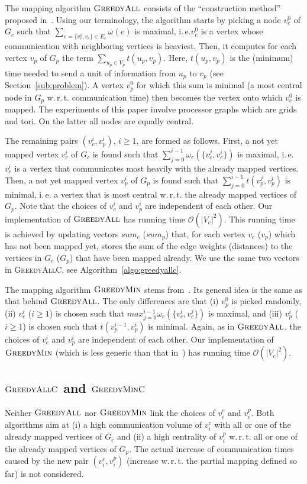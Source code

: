 \documentclass[pdftex]{llncs}
\newcommand{\ie}{i.\,e.\xspace}
\newcommand{\bigO}{\mathcal{O}}
\newcommand{\wrt}{w.\,r.\,t.\xspace}
\newcommand{\greedyall}{\textsc{GreedyAll}\xspace}
\newcommand{\greedyallc}{\textsc{GreedyAllC}\xspace}
\newcommand{\greedymin}{\textsc{GreedyMin}\xspace}
\newcommand{\greedyminc}{\textsc{GreedyMinC}\xspace}
\begin{document}
The mapping algorithm $\greedyall$ consists of the ``construction
method'' proposed in~\cite{Brandfass2013372}. Using our terminology,
the algorithm starts by picking a node $v^0_c$ of $G_c$ such that
$\sum_{e = \{v^0_c, v_c\} \in E_c} \omega(e)$ is maximal, \ie $v^0_c$
is a vertex whose communication with neighboring vertices is
heaviest. Then, it computes for each vertex $v_p$ of $G_p$ the term
$\sum_{u_p \in V_p} t(u_p, v_p)$. Here, $t(u_p, v_p)$ is the (minimum)
time needed to send a unit of information from $u_p$ to $v_p$ (see
Section~\ref{sub:problem}). A vertex $v^0_p$ for which this sum is
minimal (a most central node in $G_p$ \wrt communication time) then
becomes the vertex onto which $v^0_c$ is mapped. The experiments of
this paper involve processor graphs which are grids and tori. On the
latter all nodes are equally central.

The remaining pairs $(v^i_c, v^i_p)$, $i \geq 1$, are formed as
follows. First, a not yet mapped vertex $v^i_c$ of $G_c$ is found such
that $\sum^{i-1}_{j=0}\omega_c(\{v^j_c, v^{i}_c\})$ is maximal, \ie
$v^i_c$ is a vertex that communicates most heavily with the already
mapped vertices. Then, a not yet mapped vertex $v^i_p$ of $G_p$ is
found such that $\sum^{i-1}_{j=0}t(v^j_p, v^i_p)$ is minimal, \ie a
vertex that is most central \wrt the already mapped vertices of
$G_p$. Note that the choices of $v^i_c$ and $v^i_p$ are independent of
each other. Our implementation of $\greedyall$ has running time
$\bigO(\vert V_c \vert^2)$. This running time is achieved by updating
vectors $sum_c$ ($sum_p$) that, for each vertex $v_c$ ($v_p$) which
has not been mapped yet, stores the sum of the edge weights
(distances) to the vertices in $G_c$ ($G_p$) that have been mapped
already. We use the same two vectors in \greedyallc, see
Algorithm~\ref{algo:greedyallc}.

\label{sec:greedymin}
The mapping algorithm $\greedymin$ stems
from~\cite{hoefler-topomap}. Its general idea is the same as that
behind $\greedyall$. The only differences are that (i) $v^0_p$ is
picked randomly, (ii) $v^i_c$ ($i \geq 1$) is chosen such that
$max^{i-1}_{j=0}\omega_c(\{v^i_c, v^j_c\})$ is maximal, and (iii)
$v^i_p$ ($i \geq 1$) is chosen such that $t(v^{i-1}_p, v^i_p)$ is
minimal. Again, as in $\greedyall$, the choices of $v^i_c$ and $v^i_p$
are independent of each other. Our implementation of $\greedymin$
(which is less generic than that in~\cite{hoefler-topomap}) has
running time $\bigO(\vert V_c \vert^2)$.

\subsection{$\greedyallc$ and $\greedyminc$}
\label{sec:greedy+}
Neither $\greedyall$ nor $\greedymin$ link the choices of $v^c_i$ and
$v^p_i$. Both algorithms aim at (i) a high communication volume of
$v^c_i$ with all or one of the already mapped vertices of $G_c$ and
(ii) a high centrality of $v^p_i$ \wrt all or one of the already
mapped vertices of $G_p$. The actual increase of communication times
caused by the new pair $(v^c_i, v^p_i)$ (increase \wrt the partial
mapping defined so far) is not considered.
 
\end{document}
